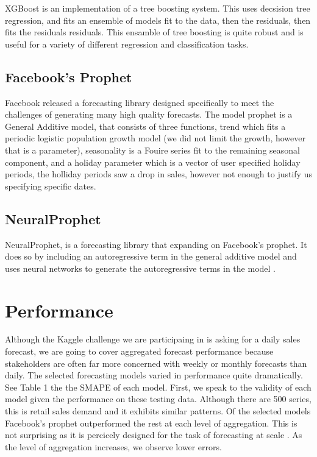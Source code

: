 \documentclass[16pt,twocolumn,letterpaper]{article}
\begin{document}
XGBoost is an implementation of a tree boosting system. This uses decsision tree regression, and fits an ensemble of models fit to the data, then the residuals, then fits the residuals residuals. This ensamble of tree boosting is quite robust and is useful for a variety of different regression and classification tasks\cite{chen2015xgboost}.

\subsection{Facebook's Prophet}

Facebook released a forecasting library designed specifically to meet the challenges of generating many high quality forecasts. The model prophet is a General Additive model, that consists of three functions, trend which fits a periodic logistic population growth model (we did not limit the growth, however that is a parameter), seasonality is a Fouire series fit to the remaining seasonal component, and a holiday parameter which is a vector of user specified holiday periods, the holliday periods saw a drop in sales, however not enough to justify us specifying specific dates\cite{taylor2018forecasting}. 

\subsection{NeuralProphet}

NeuralProphet, is a forecasting library that expanding on Facebook's prophet. It does so by including an autoregressive term in the general additive model and uses neural networks to generate the autoregressive terms in the model \cite{triebe2021neuralprophet}.

\section{Performance}

Although the Kaggle challenge we are participaing in is asking for a daily sales forecast, we are going to cover aggregated forecast performance because stakeholders are often far more concerned with weekly or monthly forecasts than daily. The selected forecasting models varied in performance quite dramatically. See Table 1 the the SMAPE of each model. First, we speak to the validity of each model given the performance on these testing data. Although there are 500 series, this is retail sales demand and it exhibits similar patterns. Of the selected models Facebook's prophet outperformed the rest at each level of aggregation. This is not surprising as it is percicely designed for the task of forecasting at scale \cite{taylor2018forecasting}. As the level of aggregation increases, we observe lower errors. 
\end{document}
